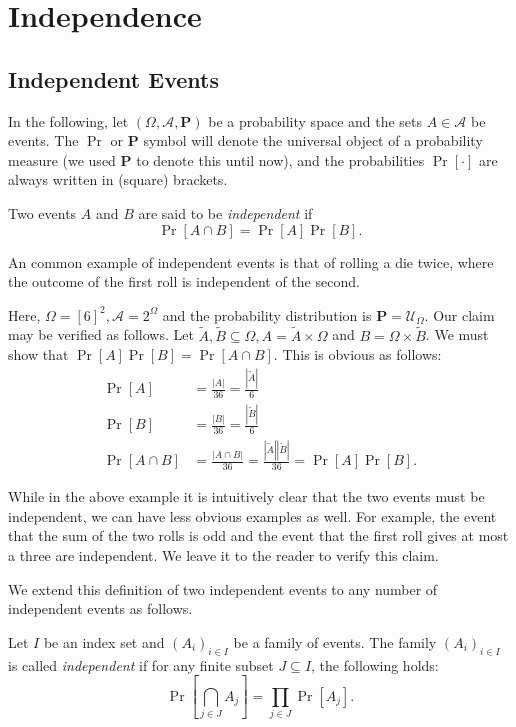 \section{Independence}

\subsection{Independent Events}

In the following, let $(\Omega,\mathcal{A},\textbf{P})$ be a probability space and the sets $A\in\mathcal{A}$ be events. The $\Pr$ or $\textbf{P}$ symbol will denote the universal object of a probability measure (we used $\textbf{P}$ to denote this until now), and the probabilities $\Pr[\cdot]$ are always written in (square) brackets.
    
\begin{definition}
    Two events $A$ and $B$ are said to be \textit{independent} if
    $$\Pr[A\cap B] = \Pr[A]\Pr[B].$$
\end{definition}

An common example of independent events is that of rolling a die twice, where the outcome of the first roll is independent of the second.

Here, $\Omega=[6]^2, \mathcal{A}=2^\Omega$ and the probability distribution is $\textbf{P}=\mathcal{U}_\Omega$. Our claim may be verified as follows. Let $\tilde A,\tilde B\subseteq\Omega, A=\tilde A\times\Omega$ and $B=\Omega\times\tilde B$. We must show that $\Pr[A]\Pr[B]=\Pr[A\cap B]$. This is obvious as follows:
\begin{align*}
    \Pr[A] &= \frac{|A|}{36}=\frac{|\tilde A|}{6} \\
    \Pr[B] &= \frac{|B|}{36}=\frac{|\tilde B|}{6} \\
    \Pr[A\cap B] &= \frac{|A\cap B|}{36} = \frac{|\tilde A||\tilde B|}{36} = \Pr[A]\Pr[B].
\end{align*}

While in the above example it is intuitively clear that the two events must be independent, we can have less obvious examples as well. For example, the event that the sum of the two rolls is odd and the event that the first roll gives at most a three are independent. We leave it to the reader to verify this claim.

\vspace{2mm}
We extend this definition of two independent events to any number of independent events as follows.

\begin{definition}
    Let $I$ be an index set and $(A_i)_{i\in I}$ be a family of events. The family $(A_i)_{i\in I}$ is called \textit{independent} if for any finite subset $J\subseteq I$, the following holds:
    $$\Pr\left[\bigcap_{j\in J}A_j\right]=\prod_{j\in J}\Pr[A_j].$$
\end{definition}

